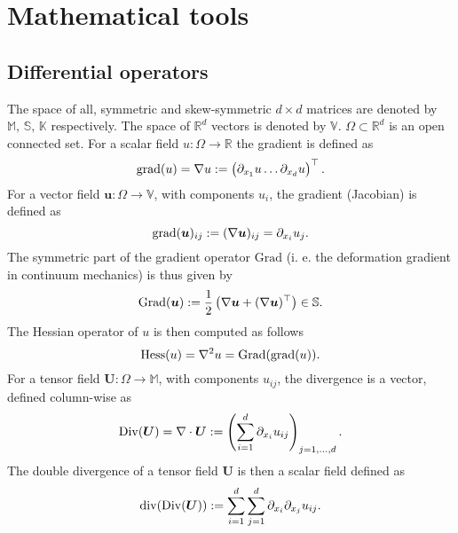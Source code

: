 \chapter{Mathematical tools}
\label{app:math}

\section{Differential operators}

The space of all, symmetric and skew-symmetric $d\times d$ matrices are denoted by $\mathbb{M},\, \mathbb{S},\, \mathbb{K}$ respectively. The space of $\mathbb{R}^d$ vectors is denoted by $\mathbb{V}$. $\Omega \subset \mathbb{R}^d$ is an open connected set. For a scalar field $u: \Omega \rightarrow \mathbb{R}$ the gradient is defined as 
\begin{equation*}
\operatorname*{grad}(u) =  \nabla u := \begin{pmatrix}
\partial_{x_1} u \dots \partial_{x_d} u \\
\end{pmatrix}^\top.
\end{equation*}
For a vector field $\bm{u}: \Omega \rightarrow \mathbb{V}$, with components $u_i$, the gradient (Jacobian) is defined as
\begin{equation*}
\operatorname*{grad}(\bm{u})_{i j}:= (\nabla \bm{u})_{ij} = \partial_{x_i} u_j.
\end{equation*}
The symmetric part of the gradient operator $\mathrm{Grad}$ (i. e. the deformation gradient in continuum mechanics) is thus given by
\begin{equation*}
\operatorname*{Grad}(\bm{u}) := \frac{1}{2} \left(\nabla \bm{u} + (\nabla\bm{u})^\top \right) \in \mathbb{S}.
\end{equation*}
The Hessian operator of $u$ is then computed as follows
\begin{equation*}
\operatorname*{Hess}(u) = \nabla^2 u = \operatorname*{Grad}(\operatorname*{grad}(u)).
\end{equation*}
For a tensor field $\bm{U}: \Omega \rightarrow \mathbb{M}$, with components $u_{ij}$, the divergence is a vector, defined column-wise as
\begin{equation*}
\operatorname*{Div}(\bm U) = \nabla \cdot \bm{U} := \left( \sum_{i = 1}^d \partial_{x_i} u_{ij} \right)_{j = 1, \dots, d}.
\end{equation*}
The double divergence of a tensor field $\bm{U}$ is then a scalar field defined as
\begin{equation*}
\operatorname{div}(\operatorname*{Div}(\bm U)):= \sum_{i = 1}^d \sum_{j = 1}^d \partial_{x_i} \partial_{x_j} u_{ij}.
\end{equation*}

